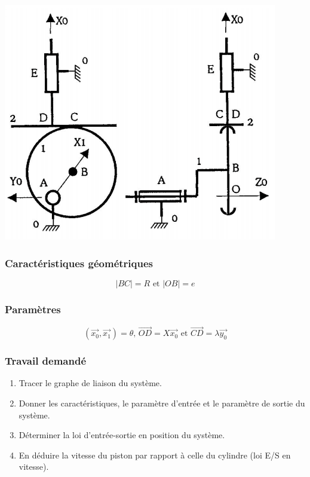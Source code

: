 \begin{center}
    \includegraphics[scale=0.4]{png/1_exo1.png}
\end{center}

\subsubsection{Caractéristiques géométriques}
\[ |BC|=R \mbox{ et } |OB|=e \]

\subsubsection{Paramètres}
\[ (\overrightarrow{x_0},\overrightarrow{x_1})=\theta \mbox{, } \overrightarrow{OD}=X\overrightarrow{x_0} \mbox{ et } \overrightarrow{CD}=\lambda\overrightarrow{y_0} \]

\subsubsection{Travail demandé}
\begin{enumerate}
\item Tracer le graphe de liaison du système.
\item Donner les caractéristiques, le paramètre d'entrée et le paramètre de sortie du système.
\item Déterminer la loi d'entrée-sortie en position du système.
\item En déduire la vitesse du piston par rapport à celle du cylindre (loi E/S en vitesse).
\end{enumerate}

